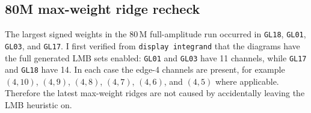 \documentclass[11pt]{article}
\begin{document}
\subsection{80M max-weight ridge recheck}

The largest signed weights in the \(80\,\mathrm{M}\) full-amplitude run
occurred in \texttt{GL18}, \texttt{GL01}, \texttt{GL03}, and \texttt{GL17}.
I first verified from \texttt{display integrand} that the diagrams have the
full generated LMB sets enabled: \texttt{GL01} and \texttt{GL03} have 11
channels, while \texttt{GL17} and \texttt{GL18} have 14.  In each case the
edge-4 channels are present, for example \((4,10)\), \((4,9)\), \((4,8)\),
\((4,7)\), \((4,6)\), and \((4,5)\) where applicable.  Therefore the latest
max-weight ridges are not caused by accidentally leaving the LMB heuristic on.
\end{document}
